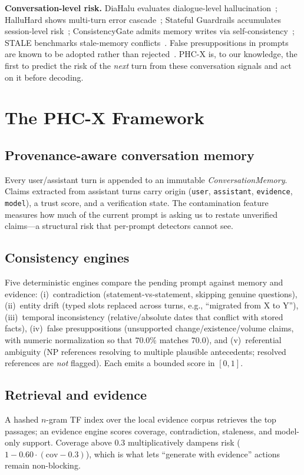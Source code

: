 \documentclass[conference,a4paper]{IEEEtran}
\begin{document}
\textbf{Conversation-level risk.} DiaHalu evaluates dialogue-level
hallucination~\cite{dihalu}; HalluHard shows multi-turn error
cascade~\cite{halluhard}; Stateful Guardrails accumulates session-level
risk~\cite{statefulguardrails}; ConsistencyGate admits memory writes via
self-consistency~\cite{consistencygate}; STALE benchmarks stale-memory
conflicts~\cite{stale}. False presuppositions in prompts are known to be
adopted rather than rejected~\cite{sieker2025}. PHC-X is, to our knowledge,
the first to predict the risk of the \emph{next} turn from these
conversation signals and act on it before decoding.

\section{The PHC-X Framework}
\subsection{Provenance-aware conversation memory}
Every user/assistant turn is appended to an immutable
\emph{ConversationMemory}. Claims extracted from assistant turns carry
origin (\texttt{user}, \texttt{assistant}, \texttt{evidence}, \texttt{model}),
a trust score, and a verification state. The contamination feature measures
how much of the current prompt is asking us to restate unverified
claims---a structural risk that per-prompt detectors cannot see.

\subsection{Consistency engines}
Five deterministic engines compare the pending prompt against memory and
evidence: (i)~contradiction (statement-vs-statement, skipping genuine
questions), (ii)~entity drift (typed slots replaced across turns, e.g.,
``migrated from X to Y''), (iii)~temporal inconsistency (relative/absolute
dates that conflict with stored facts), (iv)~false presuppositions
(unsupported change/existence/volume claims, with numeric normalization so
that $70.0\%$ matches $70.0$), and (v)~referential ambiguity (NP references
resolving to multiple plausible antecedents; resolved references are
\emph{not} flagged). Each emits a bounded score in $[0,1]$.

\subsection{Retrieval and evidence}
A hashed $n$-gram TF index over the local evidence corpus retrieves the top
passages; an evidence engine scores coverage, contradiction, staleness, and
model-only support. Coverage above $0.3$ multiplicatively dampens risk
($1-0.60\cdot(\text{cov}-0.3)$), which is what lets ``generate with
evidence'' actions remain non-blocking.
\end{document}

